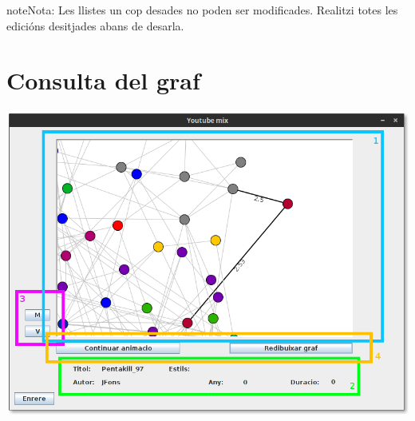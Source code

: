 \documentclass[a4paper,10pt,oneside]{sphinxmanual}
\begin{document}
\begin{notice}{note}{Nota:}
Les llistes un cop desades no poden ser modificades. Realitzi totes les edicións desitjades abans de desarla.
\end{notice}


\section{Consulta del graf}
\label{gen_llistes:consulta-del-graf}
\includegraphics{consult_graf.png}
\end{document}
